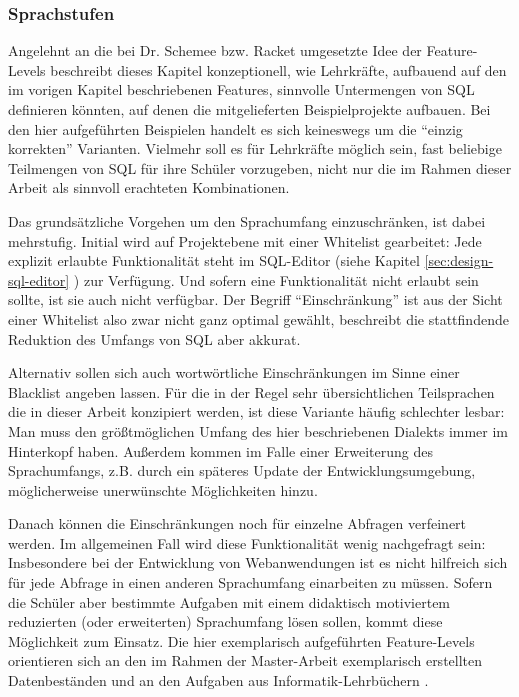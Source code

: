 \subsubsection{Sprachstufen}
\label{sec:sql-subset-ranks}

Angelehnt an die bei Dr. Schemee bzw. Racket umgesetzte Idee der Feature-Levels \cite{macht-der-abstraktion} beschreibt dieses Kapitel konzeptionell, wie Lehrkräfte, aufbauend auf den im vorigen Kapitel beschriebenen Features, sinnvolle Untermengen von SQL definieren könnten, auf denen die mitgelieferten Beispielprojekte aufbauen. Bei den hier aufgeführten Beispielen handelt es sich keineswegs um die "`einzig korrekten"' Varianten. Vielmehr soll es für Lehrkräfte möglich sein, fast beliebige Teilmengen von SQL für ihre Schüler vorzugeben, nicht nur die im Rahmen dieser Arbeit als sinnvoll erachteten Kombinationen.

Das grundsätzliche Vorgehen um den Sprachumfang einzuschränken, ist dabei mehrstufig. Initial wird auf Projektebene mit einer Whitelist gearbeitet: Jede explizit erlaubte Funktionalität steht im SQL-Editor (siehe Kapitel \ref{sec:design-sql-editor} ) zur Verfügung. Und sofern eine Funktionalität nicht erlaubt sein sollte, ist sie auch nicht verfügbar. Der Begriff ``Einschränkung'' ist aus der Sicht einer Whitelist also zwar nicht ganz optimal gewählt, beschreibt die stattfindende Reduktion des Umfangs von SQL aber akkurat.

Alternativ sollen sich auch wortwörtliche Einschränkungen im Sinne einer Blacklist angeben lassen. Für die in der Regel sehr übersichtlichen Teilsprachen die in dieser Arbeit konzipiert werden, ist diese Variante häufig schlechter lesbar: Man muss den größtmöglichen Umfang des hier beschriebenen Dialekts immer im Hinterkopf haben. Außerdem kommen im Falle einer Erweiterung des Sprachumfangs, z.B. durch ein späteres Update der Entwicklungsumgebung, möglicherweise unerwünschte Möglichkeiten hinzu.

Danach können die Einschränkungen noch für einzelne Abfragen verfeinert werden. Im allgemeinen Fall wird diese Funktionalität wenig nachgefragt sein: Insbesondere bei der Entwicklung von Webanwendungen ist es nicht hilfreich sich für jede Abfrage in einen anderen Sprachumfang einarbeiten zu müssen. Sofern die Schüler aber bestimmte Aufgaben mit einem didaktisch motiviertem reduzierten (oder erweiterten) Sprachumfang lösen sollen, kommt diese Möglichkeit zum Einsatz. Die hier exemplarisch aufgeführten Feature-Levels orientieren sich an den im Rahmen der Master-Arbeit exemplarisch erstellten Datenbeständen und an den Aufgaben aus Informatik-Lehrbüchern \cite{hubwieser_inf_2, grimm_informatik_2015}.

